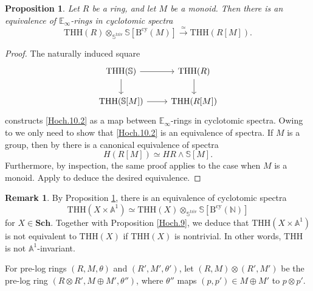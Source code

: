 \documentclass[11pt, a4paper]{amsart}
\newtheorem{prop}[thm]{Proposition}
\theoremstyle{definition}
\newtheorem{rmk}[thm]{Remark}
\numberwithin{equation}{subsection}
\newcommand{\N}{\mathbb{N}}
\newcommand{\E}{\mathbb{E}}
\newcommand{\A}{\mathbb{A}}
\newcommand{\Sch}{\mathbf{Sch}}
\newcommand{\THH}{\mathrm{THH}}
\newcommand{\Bcy}{\operatorname{B^{cy}}}
\newcommand{\Sphere}{\mathbb{S}}
\newcommand{\Eilenberg}{H}
\newcommand{\Striv}{\mathbb{S}^{\mathrm{triv}}}
\begin{document}
\begin{prop}
\label{Hoch.10}
Let $R$ be a ring, and let $M$ be a monoid.
Then there is an equivalence of $\E_\infty$-rings in cyclotomic spectra
\begin{equation}
\label{Hoch.10.2}
\THH(R)
\otimes_{\Striv}
\Sphere[\Bcy(M)]
\xrightarrow{\simeq}
\THH(R[M]).
\end{equation}
\end{prop}
\begin{proof}
The naturally induced square
\[
\begin{tikzcd}
\THH(\Sphere)\ar[d]\ar[r]&
\THH(R)\ar[d]
\\
\THH(\Sphere[M])\ar[r]&
\THH(R[M])
\end{tikzcd}
\]
constructs \eqref{Hoch.10.2} as a map between $\E_\infty$-rings in cyclotomic spectra.
Owing to \cite[Corollary II.1.7]{NikolausScholze} we only need to show that \eqref{Hoch.10.2} is an equivalence of spectra.
If $M$ is a group, 
then by \cite[Proposition 3.2]{zbMATH05688706} there is a canonical equivalence of spectra 
\begin{equation}
\label{Hoch.10.1}
\Eilenberg (R[M])
\simeq
\Eilenberg R
\wedge
\Sphere[M].
\end{equation}
Furthermore, by inspection,
the same proof applies to the case when $M$ is a monoid.
Apply \cite[Theorem 7.1]{zbMATH00938856} to deduce the desired equivalence.
\end{proof}

\begin{rmk}
\label{rmk:nonA1}
By Proposition \ref{Hoch.10}, there is an equivalence of cyclotomic spectra
\[
\THH(X\times \A^1)
\simeq
\THH(X) \otimes_{\Striv}\Sphere[\Bcy(\N)]
\]
for $X\in \Sch$.
Together with Proposition \ref{Hoch.9}, we deduce that $\THH(X\times \A^1)$ is not equivalent to $\THH(X)$ if $\THH(X)$ is nontrivial.
In other words, $\THH$ is not $\A^1$-invariant.
\end{rmk}

For pre-log rings $(R,M,\theta)$ and $(R',M',\theta')$, 
let $(R,M)\otimes (R',M')$ be the pre-log ring $(R\otimes R',M\oplus M',\theta'')$, 
where $\theta''$ maps $(p,p')\in M\oplus M'$ to $p\otimes p'$.
\end{document}
